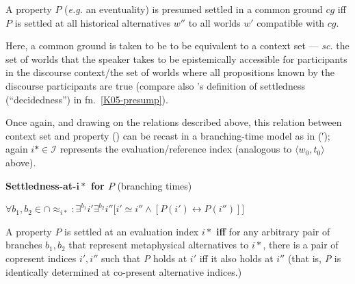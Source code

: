 \documentclass[11pt,dvipsnames]{report}
\begin{document}
A property $P$ (\textit{e.g.} an eventuality) is presumed settled in a common ground $cg$ iff $P$ is settled at all historical alternatives $ w'' $ to all worlds $ w' $ compatible with $ cg $.

Here, a common ground is taken to be to be equivalent to a context set \citep[$ \cap\textit{cg} $, \textit{cf.}][321\textit{ff}]{Stalnaker1978} --- \textit{sc. }the set of worlds that the speaker takes to be epistemically accessible for participants in the discourse context/the set of worlds where all propositions known by the discourse participants are true (compare also \citeauthor{Kaufmann2005}'s definition of settledness (``decidedness'') in fn.~\ref{K05-presump}).
\xe

Once again, and drawing on the relations described above, this relation between context set and property () can be recast in a branching-time model as in (′); again $ i*\in\mathcal I $ represents the evaluation/reference index (analogous to $ \langle w_0,t_0\rangle $ above).

\pex[exno=\getref{HistNec}′]\textbf{Settledness-at-$ \boldsymbol{i*} $ for $ \boldsymbol{\mathit P} $} (branching times)





\nobreak$\forall b_1,b_2\in\cap{\approx_{i*}}:\exists^{b_1}i'\exists^{b_2}i''\big[i'\simeq i''\wedge [P(i')\leftrightarrow P(i'')]\big]$

\nobreak A property $ P $ is settled at an evaluation index $ i* $ \textbf{iff} for any arbitrary pair of branches $ b_1,b_2 $ that represent metaphysical alternatives to $ i* $, there is a pair of copresent indices $ i',i'' $ such that \textit{P} holds at $ i' $ iff it also holds at $ i'' $ (that is, \textit{P} is identically determined at co-present alternative indices.)
\end{document}
